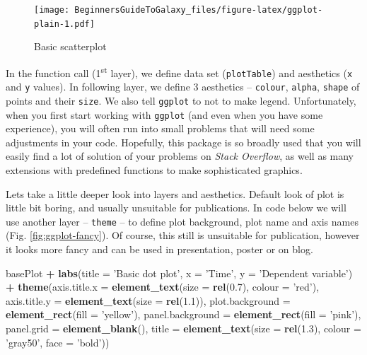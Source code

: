 \documentclass[]{book}
\newenvironment{Shaded}{\begin{snugshade}}{\end{snugshade}}
\newcommand{\KeywordTok}[1]{\textcolor[rgb]{0.13,0.29,0.53}{\textbf{#1}}}
\newcommand{\DataTypeTok}[1]{\textcolor[rgb]{0.13,0.29,0.53}{#1}}
\newcommand{\FloatTok}[1]{\textcolor[rgb]{0.00,0.00,0.81}{#1}}
\newcommand{\StringTok}[1]{\textcolor[rgb]{0.31,0.60,0.02}{#1}}
\newcommand{\OperatorTok}[1]{\textcolor[rgb]{0.81,0.36,0.00}{\textbf{#1}}}
\newcommand{\NormalTok}[1]{#1}
\theoremstyle{definition}
\theoremstyle{definition}
\theoremstyle{definition}
\theoremstyle{remark}
\begin{document}
\begin{figure}
\centering
\texttt{[image: BeginnersGuideToGalaxy\_files/figure-latex/ggplot-plain-1.pdf]}
\caption{\label{fig:ggplot-plain}Basic scatterplot}
\end{figure}

In the function call (1\textsuperscript{st} layer), we define data set
(\texttt{plotTable}) and aesthetics (\texttt{x} and \texttt{y} values).
In following layer, we define 3 aesthetics -- \texttt{colour},
\texttt{alpha}, \texttt{shape} of points and their \texttt{size}. We
also tell \texttt{ggplot} to not to make legend. Unfortunately, when you
first start working with \texttt{ggplot} (and even when you have some
experience), you will often run into small problems that will need some
adjustments in your code. Hopefully, this package is so broadly used
that you will easily find a lot of solution of your problems on
\emph{Stack Overflow}, as well as many extensions with predefined
functions to make sophisticated graphics.

Lets take a little deeper look into layers and aesthetics. Default look
of plot is little bit boring, and usually unsuitable for publications.
In code below we will use another layer -- \texttt{theme} -- to define
plot background, plot name and axis names (Fig. \ref{fig:ggplot-fancy}).
Of course, this still is unsuitable for publication, however it looks
more fancy and can be used in presentation, poster or on blog.

\begin{Shaded}
\begin{Highlighting}[]
\NormalTok{basePlot }\OperatorTok{+}
\StringTok{  }\KeywordTok{labs}\NormalTok{(}\DataTypeTok{title =} \StringTok{'Basic dot plot'}\NormalTok{, }\DataTypeTok{x =} \StringTok{'Time'}\NormalTok{, }\DataTypeTok{y =} \StringTok{'Dependent variable'}\NormalTok{) }\OperatorTok{+}
\StringTok{  }\KeywordTok{theme}\NormalTok{(}\DataTypeTok{axis.title.x     =} \KeywordTok{element_text}\NormalTok{(}\DataTypeTok{size =} \KeywordTok{rel}\NormalTok{(}\FloatTok{0.7}\NormalTok{), }\DataTypeTok{colour =} \StringTok{'red'}\NormalTok{),}
        \DataTypeTok{axis.title.y     =} \KeywordTok{element_text}\NormalTok{(}\DataTypeTok{size =} \KeywordTok{rel}\NormalTok{(}\FloatTok{1.1}\NormalTok{)), }
        \DataTypeTok{plot.background  =} \KeywordTok{element_rect}\NormalTok{(}\DataTypeTok{fill =} \StringTok{'yellow'}\NormalTok{),}
        \DataTypeTok{panel.background =} \KeywordTok{element_rect}\NormalTok{(}\DataTypeTok{fill =} \StringTok{'pink'}\NormalTok{),}
        \DataTypeTok{panel.grid       =} \KeywordTok{element_blank}\NormalTok{(),}
        \DataTypeTok{title            =} \KeywordTok{element_text}\NormalTok{(}\DataTypeTok{size =} \KeywordTok{rel}\NormalTok{(}\FloatTok{1.3}\NormalTok{),}
                                        \DataTypeTok{colour =} \StringTok{'gray50'}\NormalTok{,}
                                        \DataTypeTok{face =} \StringTok{'bold'}\NormalTok{))}
\end{Highlighting}
\end{Shaded}
\end{document}
